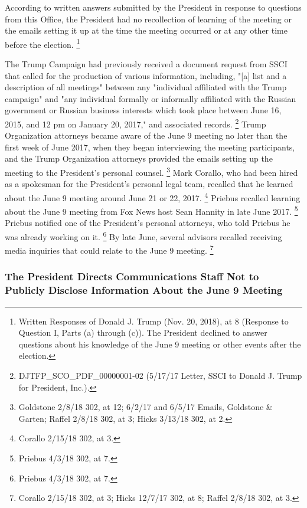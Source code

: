 According to written answers submitted by the President in response to questions from this Office, the President had no recollection of learning of the meeting or the emails setting it up at the time the meeting occurred or at any other time before the election.%
\footnote{Written Responses of Donald J. Trump (Nov. 20, 2018), at 8 (Response to Question I, Parts (a) through (c)).
The President declined to answer questions about his knowledge of the June 9 meeting or other events after the election.}

The Trump Campaign had previously received a document request from SSCI that called for the production of various information, including, "[a] list and a description of all meetings" between any "individual affiliated with the Trump campaign" and "any individual formally or informally affiliated with the Russian government or Russian business interests which took place between June 16, 2015, and 12 pm on January 20, 2017," and associated records.%
\footnote{DJTFP\_SCO\_PDF\_00000001-02 (5/17/17 Letter, SSCI to Donald J. Trump for President, Inc.).}
Trump Organization attorneys became aware of the June 9 meeting no later than the first week of June 2017, when they began interviewing the meeting participants, and the Trump Organization attorneys provided the emails setting up the meeting to the President's personal counsel.%
\footnote{Goldstone 2/8/18 302, at 12;
6/2/17 and 6/5/17 Emails, Goldstone \& Garten;
Raffel 2/8/18 302, at 3;
Hicks 3/13/18 302, at 2.}
Mark Corallo, who had been hired as a spokesman for the President's personal legal team, recalled that he learned about the June 9 meeting around June 21 or 22, 2017.%
\footnote{Corallo 2/15/18 302, at 3.}
Priebus recalled learning about the June 9 meeting from Fox News host Sean Hannity in late June 2017.%
\footnote{Priebus 4/3/18 302, at 7.}
Priebus notified one of the President's personal attorneys, who told Priebus he was already working on it.%
\footnote{Priebus 4/3/18 302, at 7.}
By late June, several advisors recalled receiving media inquiries that could relate to the June 9 meeting.%
\footnote{Corallo 2/15/18 302, at 3;
Hicks 12/7/17 302, at 8;
Raffel 2/8/18 302, at 3.}

\subsubsection{The President Directs Communications Staff Not to Publicly Disclose Information About the June 9 Meeting}

